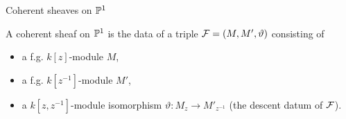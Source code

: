 \documentclass[
  xcolor=dvipsnames,
  aspectratio=169,
  compress
]{beamer}
\begin{document}
\iffalse
\begin{frame}{From $\aff{1}$ to $\proj{1}$}
  \begin{itemize}
    \item
      Since $\proj{1}$ is charted by two copies of $\aff{1}$, why not define \alert{coherent sheaves} to be pairs of f.g. modules $(M, M')$ over $k[z]$ and $k[z^{-1}]$?

      \pause
    \item
      We need to be careful: the intersection $U_{xy} = U_x \cap U_y$ is huge, so $M$ and $M'$ will have lots of overlapping sheaf data.

      \pause
      \iffalse
    \item
      Both $z$ and $z^{-1}$ are invertible on $U_{xy}$, so there we are really working\footnote{Scheme theory makes this quite formal, as $U_{xy} = \Spec{k[z, z^{-1}]}$.} over the ring $k[z, z^{-1}]$ of \alert{Laurent polynomials} in $z$.
      \fi

      \pause
    \item
      The localisations $M_z$ and $M'_{z^{-1}}$ are naturally modules over $k[z, z^{-1}]$, and they both contain sheaf data for $U_{xy}$.
  \end{itemize}
\end{frame}
\fi

\begin{frame}{Coherent sheaves on $\proj{1}$}
  \begin{definition}
    A \alert{coherent sheaf} on $\proj{1}$ is the data of a triple $\mathcal{F} = (M, M', \vartheta)$ consisting of
    \begin{itemize}
      \item a f.g. $k[z]$-module $M$,
      \item a f.g. $k[z^{-1}]$-module $M'$,
      \item a $k[z, z^{-1}]$-module isomorphism $\vartheta: M_{z} \to M'_{z^{-1}}$ (the \alert{descent datum} of $\mathcal{F}$).
    \end{itemize}
  \end{definition}

  \pause

  \iffalse
  Describing sections and restriction maps is quite technical, but \alert{global} sections are easy: just pairs $(m, m') \in M \times M'$ such that $\vartheta(m) = m'$.
  \fi
\end{frame}
\end{document}

